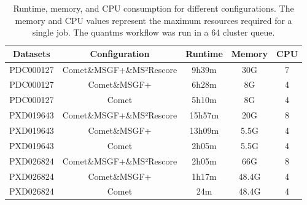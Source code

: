 \documentclass[12pt]{article}
\begin{document}
\renewcommand\thetable{S\arabic{table}}
\setcounter{table}{0}

\begin{table}[h!]
	\centering
	\caption{Runtime, memory, and CPU consumption for different configurations. The memory and CPU values represent the maximum resources required for a single job. The quantms workflow was  run in a 64 cluster queue.}
	\begin{tabular}{|c|c|c|c|c|}
		\hline
		Datasets & Configuration & Runtime& Memory & CPU \\
		\hline
		PDC000127 & Comet\&MSGF+\&MS²Rescore & 9h39m & 30G & 7 \\
		PDC000127 & Comet\&MSGF+ & 6h28m & 8G & 4 \\
		PDC000127 & Comet & 5h10m & 8G & 4 \\
		PXD019643 & Comet\&MSGF+\&MS²Rescore & 15h57m & 20G & 8 \\
		PXD019643 & Comet\&MSGF+ & 13h09m & 5.5G & 4 \\
		PXD019643 & Comet & 2h05m & 5.5G & 4 \\
		PXD026824 & Comet\&MSGF+\&MS²Rescore & 2h05m & 66G & 8 \\
		PXD026824 & Comet\&MSGF+ & 1h17m & 48.4G & 4 \\
		PXD026824 & Comet & 24m & 48.4G & 4 \\
		\hline
	\end{tabular}
	\label{tab:resources_stats}
\end{table}
\end{document}
